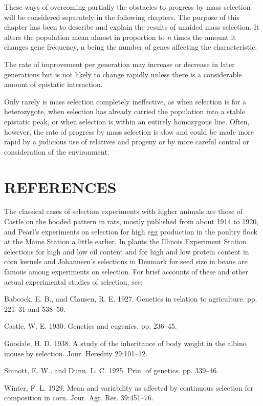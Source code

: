 These ways of overcoming partially the obstacles to progress by
mass selection will be considered separately in the following chapters.
The purpose of this chapter has been to describe and explain the results
of unaided mass selection. It alters the population mean almost in proportion
to \textit{n} times the amount it changes gene frequency, n being the
number of genes affecting the characteristic.

The rate of improvement per generation may increase or decrease
in later generations but is not likely to change rapidly unless there is a
considerable amount of epistatic interaction.

Only rarely is mass selection completely ineffective, as when selection
is for a heterozygote, when selection has already carried the population
into a stable epistatic peak, or when selection is within an
entirely homozygous line. Often, however, the rate of progress by mass
selection is slow and could be made more rapid by a judicious use of
relatives and progeny or by more careful control or consideration of the
environment.

\section*{REFERENCES}

The classical cases of selection experiments with higher animals are
those of Castle on the hooded pattern in rats, mostly published from
about 1914 to 1920, and Pearl's experiments on selection for high egg
production in the poultry flock at the Maine Station a little earlier. In
plants the Illinois Experiment Station selections for high and low oil
content and for high and low protein content in corn kernels and
Johannsen's selections in Denmark for seed size in beans are famous
among experiments on selection. For brief accounts of these and other
actual experimental studies of selection, see:

\begin{hangparas}{0.5in}{1}%
Babcock. E. B., and Clausen, R. E. 1927. Genetics in relation to agriculture. pp.
221--31 and 538--50.

Castle, W. E. 1930. Genetics and eugenics. pp. 236--45.

Goodale, H. D. 1938. A study of the inheritance of body weight in the albino
mouse by selection. Jour. Heredity 29:101--12.

Sinnott, E. W., and Dunn. L. C. 1925. Prin. of genetics. pp. 339--46.

Winter, F. L. 1929. Mean and variability as affected by continuous selection for
composition in corn. Jour. Agr. Res. 39:451--76.
\end{hangparas}
